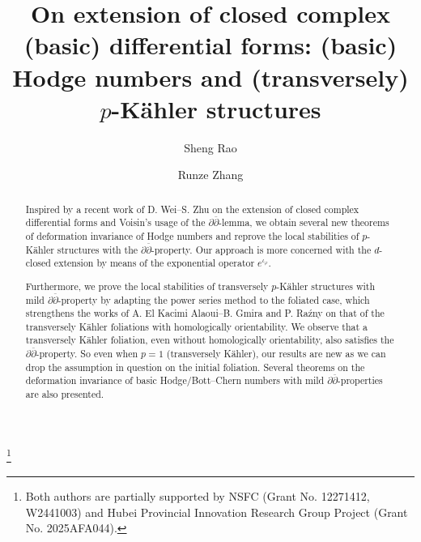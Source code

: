 \documentclass[12pt]{amsart}
\numberwithin{equation}{section}
\theoremstyle{definition}
\theoremstyle{definition}
\theoremstyle{definition}
\renewcommand{\1}{\mathsf{1}}
\renewcommand{\>}{\rightarrow}
\newcommand{\p}{\partial}
\newcommand{\bp}{\overline\partial}
\def\p{\partial}
\def\v{\varphi}
\theoremstyle{plain} %
\theoremstyle{plain} %
\theoremstyle{plain} %
\begin{document}
	\title{On extension of closed complex (basic) differential forms: (basic) Hodge numbers and (transversely) $p$-K\"ahler structures}
	\let\oldmaketitle\maketitle
	\renewcommand\maketitle{{\bfseries\boldmath\oldmaketitle}}	
	
	\begin{abstract}
		Inspired by a recent work of D. Wei--S. Zhu on the extension of  closed complex differential forms and Voisin's usage of the $\p\bp$-lemma, we obtain several  new  theorems of deformation invariance of Hodge numbers and reprove the local stabilities of $p$-K\"ahler structures with the $\p\bp$-property. Our approach is more concerned with the $d$-closed extension by means of the  exponential operator $e^{\iota_\v}$.
		
		 Furthermore, we prove the local stabilities of transversely $p$-K\"ahler structures with mild $\p\bp$-property by adapting the power series method to the foliated case, which strengthens the works of A. El Kacimi Alaoui--B. Gmira and P. Ra\'zny on that of the transversely K\"ahler foliations with homologically orientability. We observe that a transversely K\"ahler foliation, even without homologically orientability, also satisfies the $\p\bp$-property. So even when $p=1$ (transversely K\"ahler), our results are new as we can drop the  assumption in question on the initial foliation. Several theorems  on the deformation invariance of basic Hodge/Bott--Chern numbers with mild $\p\bp$-properties are also presented.
	\end{abstract}
	
	\author{Sheng Rao}
	\address{School of Mathematics and statistics, Wuhan  University,
		Wuhan 430072, China}
	\thanks{Both authors are partially supported by NSFC (Grant No. 12271412, W2441003) and Hubei Provincial Innovation Research Group Project (Grant No. 2025AFA044).}
	
	\author{Runze Zhang}
	\address{School of Mathematics and statistics, Wuhan  University,
		Wuhan 430072, China; Universit\'e C\^ote d'Azur, CNRS, Laboratoire J.-A. Dieudonn\'e, Parc Valrose, F-06108 Nice Cedex 2, France}
	
\end{document}
